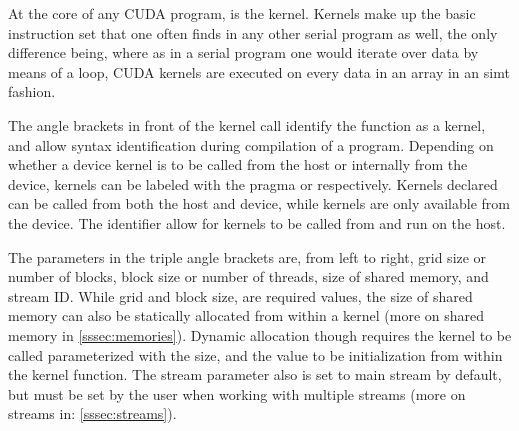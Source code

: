 At the core of any CUDA program, is the kernel. Kernels make up the basic instruction
set that one often finds in any other serial program as well, the only difference being,
where as in a serial program one would iterate over data by means of a loop,
CUDA kernels are executed on every data in an array in an \gls{simt} fashion.


The angle brackets in front of the kernel call identify the function as a kernel,
and allow syntax  identification during compilation of a program.  Depending on
whether a device kernel is to be called from the host or internally from the device,
kernels can be labeled with the pragma  or   respectively.
Kernels declared  can be called from both the host and device, while 
kernels are only available from the device.
The identifier  allow for kernels to be called from and run on the host.

The parameters in the triple angle brackets are, from left to right, grid size or number of blocks,
block size or number of threads, size of shared memory, and stream ID.  While grid and block size,
are required values, the size of shared memory can also be statically allocated from within
a kernel (more on shared memory in \ref{sssec:memories}).  Dynamic allocation though requires the kernel to be called parameterized with
the size, and the value to be initialization from within the kernel function.  The stream
parameter also is set to main stream by default, but must be set by the user when
working with multiple streams (more on streams in: \ref{sssec:streams}).
